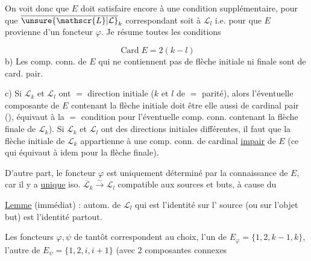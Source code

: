 On voit donc que $E$ doit satisfaire encore à une
condition supplémentaire, pour que  $\overline{\unsure{\mathscr{L}|\mathcal{L}}}_k$ correspondant
soit  à $\mathscr{L}_l$ i.e. pour que $E$ provienne d'un
foncteur $\varphi$. Je résume toutes les conditions

\[
\operatorname{Card}E=2(k-l)\tag*{a)}
\]
b) Les comp. conn. de $E$ qui ne contiennent pas
de flèche initiale ni finale sont de card. pair.

c) Si $\mathscr{L}_k$ et $\mathscr{L}_l$ ont $=$ direction initiale
($k$ et $l$ de $=$ parité), alors l'éventuelle
composante de $E$ contenant la flèche
initiale doit être elle aussi de cardinal pair
(), équivaut à la $=$
condition pour l'éventuelle comp. conn. contenant la flèche finale de $\mathscr{L}_k$). Si $\mathscr{L}_k$ et $\mathscr{L}_l$
ont des directions initiales différentes, il
faut que la flèche initiale de $\mathscr{L}_k$ appartienne
à une comp. conn. de cardinal \uline{impair} de
$E$ (ce qui équivaut à idem pour la flèche
finale).

D'autre part, le foncteur $\varphi$ est uniquement déterminé par
la connaissance de $E$, car  il y a 
\uline{unique} iso. $\overline{\mathscr{L}}_k\xrightarrow{\sim}\mathscr{L}_l$ compatible aux sources et
buts, à cause du

\uline{Lemme} (immédiat) :  autom. de $\mathscr{L}_l$ qui
est l'identité sur l'  source (ou sur l'objet
but) est l'identité partout.

Les foncteurs $\varphi,\psi$ de tantôt correspondent
au choix, l'un de $E_\varphi=\{1,2,k-1,k\}$, l'autre de
$E_\psi=\{1,2,i,i+1\}$  (avec $2$ composantes connexes
